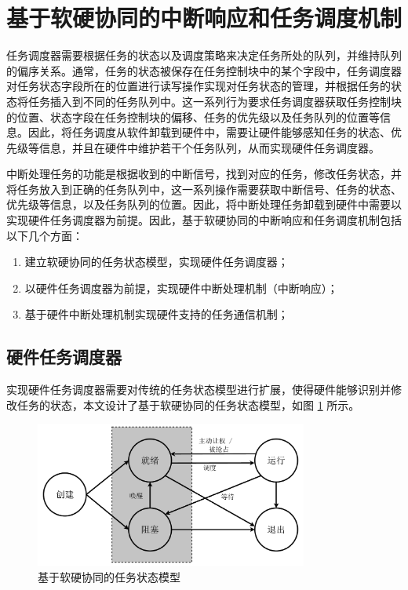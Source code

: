 \section{基于软硬协同的中断响应和任务调度机制}

任务调度器需要根据任务的状态以及调度策略来决定任务所处的队列，并维持队列的偏序关系。通常，任务的状态被保存在任务控制块中的某个字段中，任务调度器对任务状态字段所在的位置进行读写操作实现对任务状态的管理，并根据任务的状态将任务插入到不同的任务队列中。这一系列行为要求任务调度器获取任务控制块的位置、状态字段在任务控制块的偏移、任务的优先级以及任务队列的位置等信息。因此，将任务调度从软件卸载到硬件中，需要让硬件能够感知任务的状态、优先级等信息，并且在硬件中维护若干个任务队列，从而实现硬件任务调度器。

中断处理任务的功能是根据收到的中断信号，找到对应的任务，修改任务状态，并将任务放入到正确的任务队列中，这一系列操作需要获取中断信号、任务的状态、优先级等信息，以及任务队列的位置。因此，将中断处理任务卸载到硬件中需要以实现硬件任务调度器为前提。因此，基于软硬协同的中断响应和任务调度机制包括以下几个方面：

\begin{enumerate}
    \item 建立软硬协同的任务状态模型，实现硬件任务调度器；
    \item 以硬件任务调度器为前提，实现硬件中断处理机制（中断响应）；
    \item 基于硬件中断处理机制实现硬件支持的任务通信机制；
\end{enumerate}

\subsection{硬件任务调度器}

实现硬件任务调度器需要对传统的任务状态模型进行扩展，使得硬件能够识别并修改任务的状态，本文设计了基于软硬协同的任务状态模型，如图 \ref{figure:task_state} 所示。

\begin{figure}[htbp]
    \centering
    \includegraphics[width=0.8\textwidth]{figures/pdfs/task_state.pdf}
    \caption{基于软硬协同的任务状态模型}
    \label{figure:task_state}
\end{figure}

